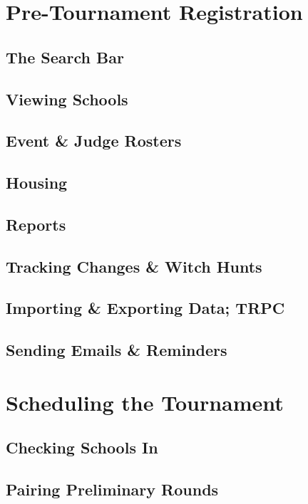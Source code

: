 \documentclass[12pt]{report}
\begin{document}
\chapter{Pre-Tournament Registration}

	\section{The Search Bar}

	\section{Viewing Schools}

	\section{Event \& Judge Rosters}

	\section{Housing}

	\section{Reports}

	\section{Tracking Changes \& Witch Hunts}

	\section{Importing \& Exporting Data; TRPC}

	\section{Sending Emails \& Reminders}

\chapter{Scheduling the Tournament}

	\section{Checking Schools In}

	\section{Pairing Preliminary Rounds}
\end{document}
